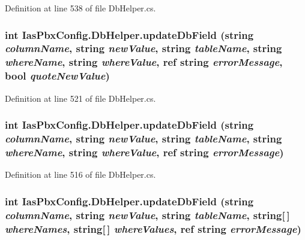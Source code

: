 Definition at line 538 of file DbHelper.cs.\hypertarget{class_ias_pbx_config_1_1_db_helper_a20b28dce1dacde9f6bf7b8ae9fc3ec36}{
\subsubsection[{updateDbField}]{\setlength{\rightskip}{0pt plus 5cm}int IasPbxConfig.DbHelper.updateDbField (string {\em columnName}, \/  string {\em newValue}, \/  string {\em tableName}, \/  string {\em whereName}, \/  string {\em whereValue}, \/  ref string {\em errorMessage}, \/  bool {\em quoteNewValue})}}
\label{class_ias_pbx_config_1_1_db_helper_a20b28dce1dacde9f6bf7b8ae9fc3ec36}


Definition at line 521 of file DbHelper.cs.\hypertarget{class_ias_pbx_config_1_1_db_helper_a773ba33589b73240e7b71a28b8d794f7}{
\subsubsection[{updateDbField}]{\setlength{\rightskip}{0pt plus 5cm}int IasPbxConfig.DbHelper.updateDbField (string {\em columnName}, \/  string {\em newValue}, \/  string {\em tableName}, \/  string {\em whereName}, \/  string {\em whereValue}, \/  ref string {\em errorMessage})}}
\label{class_ias_pbx_config_1_1_db_helper_a773ba33589b73240e7b71a28b8d794f7}


Definition at line 516 of file DbHelper.cs.\hypertarget{class_ias_pbx_config_1_1_db_helper_a6e8af81bb90d20f397a5874435e6b382}{
\subsubsection[{updateDbField}]{\setlength{\rightskip}{0pt plus 5cm}int IasPbxConfig.DbHelper.updateDbField (string {\em columnName}, \/  string {\em newValue}, \/  string {\em tableName}, \/  string\mbox{[}$\,$\mbox{]} {\em whereNames}, \/  string\mbox{[}$\,$\mbox{]} {\em whereValues}, \/  ref string {\em errorMessage})}}
\label{class_ias_pbx_config_1_1_db_helper_a6e8af81bb90d20f397a5874435e6b382}


